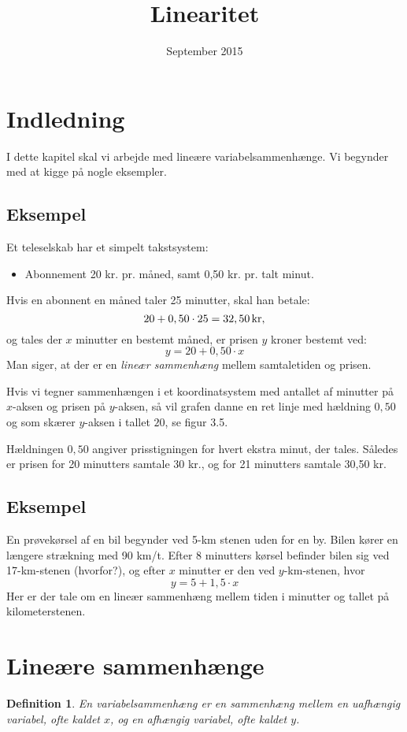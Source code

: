 \documentclass[12pt,oneside,a4paper]{article}
\title{Linearitet}
\date{September 2015}
\newtheorem{mydef}[thm]{Definition}
\begin{document}
\maketitle

\section{Indledning}
I dette kapitel skal vi arbejde med lineære variabelsammenhænge.
Vi begynder med at kigge på nogle eksempler.

\subsection{Eksempel}
Et teleselskab har et simpelt takstsystem:
\begin{itemize}
    \item Abonnement 20 kr. pr. måned, samt 0,50 kr. pr. talt minut.
\end{itemize}
Hvis en abonnent en måned taler 25 minutter, skal han betale:
$$
20 + 0,50\cdot25 = 32,50 \, {\rm kr},
$$
og tales der $x$ minutter en bestemt måned, er prisen $y$ kroner bestemt ved:
$$
y = 20 + 0,50\cdot x
$$
Man siger, at der er en {\em lineær sammenhæng} mellem samtaletiden og prisen.

Hvis vi tegner sammenhængen i et koordinatsystem med antallet af minutter på
$x$-aksen og prisen på $y$-aksen, så vil grafen danne en ret linje med hældning
$0,50$ og som skærer $y$-aksen i tallet $20$, se figur 3.5.

Hældningen $0,50$ angiver prisstigningen for hvert ekstra minut, der tales.
Således er prisen for 20 minutters samtale 30 kr., og for 21 minutters
samtale 30,50 kr.

\subsection{Eksempel}
En prøvekørsel af en bil begynder ved 5-km stenen uden for en by. Bilen kører
en længere strækning med 90 km/t. Efter 8 minutters kørsel befinder bilen sig
ved 17-km-stenen (hvorfor?), og efter $x$ minutter er den ved $y$-km-stenen,
hvor
$$
y = 5 + 1,5\cdot x
$$
Her er der tale om en lineær sammenhæng mellem tiden i minutter og tallet på
kilometerstenen.

\section{Lineære sammenhænge}
\begin{mydef}
    En variabelsammenhæng er en sammenhæng mellem en uafhængig variabel, ofte
    kaldet $x$, og en afhængig variabel, ofte kaldet $y$.
\end{mydef}
\end{document}
